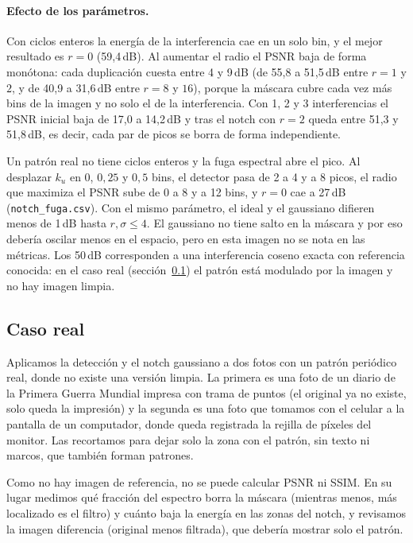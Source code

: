 \paragraph{Efecto de los parámetros.}
Con ciclos enteros la energía de la interferencia cae en un solo bin, y el mejor resultado es
$r=0$ (59{,}4\,dB). Al aumentar el radio el PSNR baja de forma monótona: cada duplicación cuesta
entre 4 y 9\,dB (de 55{,}8 a 51{,}5\,dB entre $r=1$ y $2$, y de 40{,}9 a 31{,}6\,dB entre $r=8$ y
$16$), porque la máscara cubre cada vez más bins de la imagen y no solo el de la interferencia.
Con 1, 2 y 3 interferencias el PSNR inicial baja de 17{,}0 a 14{,}2\,dB y tras el notch con $r=2$
queda entre 51{,}3 y 51{,}8\,dB, es decir, cada par de picos se borra de forma independiente.

Un patrón real no tiene ciclos enteros y la fuga espectral abre el pico. Al desplazar $k_u$ en
$0$, $0{,}25$ y $0{,}5$ bins, el detector pasa de 2 a 4 y a 8 picos, el radio que maximiza el PSNR
sube de 0 a 8 y a 12 bins, y $r=0$ cae a 27\,dB (\texttt{notch\_fuga.csv}). Con el mismo
parámetro, el ideal y el gaussiano difieren menos de 1\,dB hasta $r,\sigma\le4$. El gaussiano no
tiene salto en la máscara y por eso debería oscilar menos en el espacio, pero en esta imagen no se
nota en las métricas. Los 50\,dB corresponden a una interferencia coseno exacta con referencia
conocida: en el caso real (sección~\ref{sec:caso-real}) el patrón está modulado por la imagen y no
hay imagen limpia.

\subsection{Caso real}
\label{sec:caso-real}

Aplicamos la detección y el notch gaussiano a dos fotos con un patrón periódico real, donde no
existe una versión limpia. La primera es una foto de un diario de la Primera Guerra Mundial
impresa con trama de puntos (el original ya no existe, solo queda la impresión)
y la segunda es una foto que tomamos con el celular a la pantalla de un computador, donde queda
registrada la rejilla de píxeles del monitor. Las recortamos para dejar solo la zona con el patrón, sin
texto ni marcos, que también forman patrones.

Como no hay imagen de referencia, no se puede calcular PSNR ni SSIM. En su lugar medimos qué
fracción del espectro borra la máscara (mientras menos, más localizado es el filtro) y cuánto baja
la energía en las zonas del notch, y revisamos la imagen diferencia (original menos filtrada), que
debería mostrar solo el patrón.

